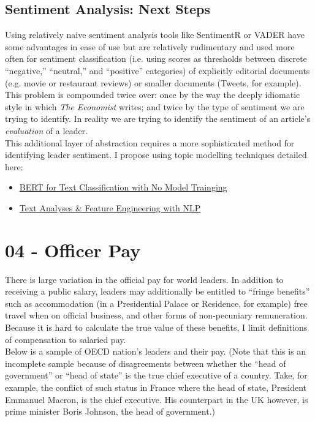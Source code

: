 \documentclass[11pt, letterpaper, twoside]{article}
\begin{document}
\subsection{Sentiment Analysis: Next Steps}
Using relatively naive sentiment analysis tools like SentimentR or VADER have some advantages in ease of use but are relatively rudimentary and used more often for sentiment classification (i.e. using scores as thresholds between discrete ``negative,'' ``neutral,'' and ``positive'' categories) of explicitly editorial documents (e.g. movie or restaurant reviews) or smaller documents (Tweets, for example). This problem is compounded twice over: once by the way the deeply idiomatic style in which \textit{The Economist} writes; and twice by the type of sentiment we are trying to identify. In reality we are trying to identify the sentiment of an article's \textit{evaluation} of a leader.\\

This additional layer of abstraction requires a more sophisticated method for identifying leader sentiment. I propose using topic modelling techniques detailed here:
\begin{itemize}
    \item \href{https://towardsdatascience.com/text-classification-with-no-model-training-935fe0e42180}{BERT for Text Classification with No Model Trainging}\\
    \item \href{https://towardsdatascience.com/text-analysis-feature-engineering-with-nlp-502d6ea9225d}{Text Analyses \& Feature Engineering with NLP}
\end{itemize}


\section{04 - Officer Pay}
There is large variation in the official pay for world leaders. In addition to receiving a public salary, leaders may additionally be entitled to ``fringe benefits'' such as accommodation (in a Presidential Palace or Residence, for example) free travel when on official business, and other forms of non-pecuniary remuneration. Because it is hard to calculate the true value of these benefits, I limit definitions of compensation to salaried pay.\\

Below is a sample of OECD nation's leaders and their pay. (Note that this is an incomplete sample because of disagreements between whether the ``head of government'' or ``head of state'' is the true chief executive of a country. Take, for example, the conflict of such status in France where the head of state, President Emmanuel Macron, is the chief executive. His counterpart in the UK however, is prime minister Boris Johnson, the head of government.)
\end{document}
